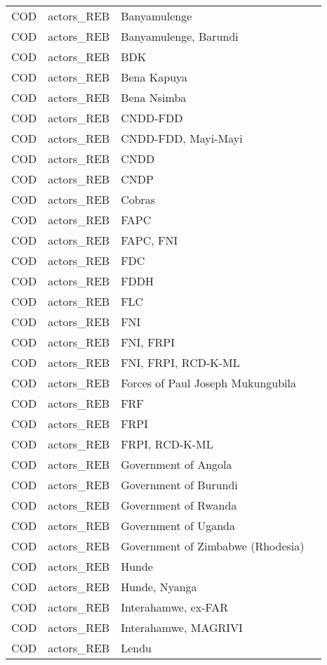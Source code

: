 \begin{table}[ht]
\begin{tabular}{llll}
  COD & actors\_REB & Banyamulenge &  \\ 
  COD & actors\_REB & Banyamulenge, Barundi &  \\ 
  COD & actors\_REB & BDK &  \\ 
  COD & actors\_REB & Bena Kapuya &  \\ 
  COD & actors\_REB & Bena Nsimba &  \\ 
  COD & actors\_REB & CNDD-FDD &  \\ 
  COD & actors\_REB & CNDD-FDD, Mayi-Mayi &  \\ 
  COD & actors\_REB & CNDD &  \\ 
  COD & actors\_REB & CNDP &  \\ 
  COD & actors\_REB & Cobras &  \\ 
  COD & actors\_REB & FAPC &  \\ 
  COD & actors\_REB & FAPC, FNI &  \\ 
  COD & actors\_REB & FDC &  \\ 
  COD & actors\_REB & FDDH &  \\ 
  COD & actors\_REB & FLC &  \\ 
  COD & actors\_REB & FNI &  \\ 
  COD & actors\_REB & FNI, FRPI &  \\ 
  COD & actors\_REB & FNI, FRPI, RCD-K-ML &  \\ 
  COD & actors\_REB & Forces of Paul Joseph Mukungubila &  \\ 
  COD & actors\_REB & FRF &  \\ 
  COD & actors\_REB & FRPI &  \\ 
  COD & actors\_REB & FRPI, RCD-K-ML &  \\ 
  COD & actors\_REB & Government of Angola &  \\ 
  COD & actors\_REB & Government of Burundi &  \\ 
  COD & actors\_REB & Government of Rwanda &  \\ 
  COD & actors\_REB & Government of Uganda &  \\ 
  COD & actors\_REB & Government of Zimbabwe (Rhodesia) &  \\ 
  COD & actors\_REB & Hunde &  \\ 
  COD & actors\_REB & Hunde, Nyanga &  \\ 
  COD & actors\_REB & Interahamwe, ex-FAR &  \\ 
  COD & actors\_REB & Interahamwe, MAGRIVI &  \\ 
  COD & actors\_REB & Lendu &  \\ 

\end{tabular}
\end{table}
